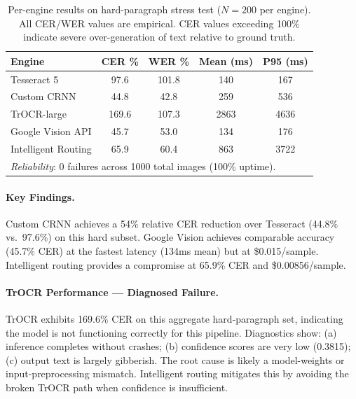 \documentclass[12pt,a4paper]{article}
\begin{document}
\begin{table}[H]
  \centering
  \small
  \begin{tabular}{lcccc}
    \toprule
    \textbf{Engine} & \textbf{CER \%} & \textbf{WER \%}
    & \textbf{Mean (ms)} & \textbf{P95 (ms)} \\
    \midrule
    Tesseract 5        & 97.6  & 101.8 & 140  & 167 \\
    Custom CRNN        & 44.8  & 42.8  & 259  & 536 \\
    TrOCR-large        & 169.6 & 107.3 & 2863 & 4636 \\
    Google Vision API  & 45.7  & 53.0  & 134  & 176 \\
    Intelligent Routing & 65.9 & 60.4  & 863  & 3722 \\
    \midrule
    \multicolumn{5}{l}{\textit{Reliability}: 0 failures across 1000
      total images (100\% uptime).} \\
    \bottomrule
  \end{tabular}
  \caption{Per-engine results on hard-paragraph stress test ($N=200$
    per engine). All CER/WER values are empirical. CER values
    exceeding 100\% indicate severe over-generation of text relative
    to ground truth.}
  \label{tab:hard_paragraph}
\end{table}

\paragraph{Key Findings.}
Custom CRNN achieves a 54\% relative CER reduction over Tesseract
(44.8\% vs.\ 97.6\%) on this hard subset. Google Vision achieves
comparable accuracy (45.7\% CER) at the fastest latency (134ms mean)
but at \$0.015/sample. Intelligent routing provides a compromise at
65.9\% CER and \$0.00856/sample.

\paragraph{TrOCR Performance --- Diagnosed Failure.}
TrOCR exhibits 169.6\% CER on this aggregate hard-paragraph set,
indicating the model is not functioning correctly for this pipeline.
Diagnostics show: (a) inference completes without crashes; (b)
confidence scores are very low (0.3815); (c) output text is largely
gibberish. The root cause is likely a model-weights or
input-preprocessing mismatch. Intelligent routing mitigates this by
avoiding the broken TrOCR path when confidence is insufficient.
\end{document}
